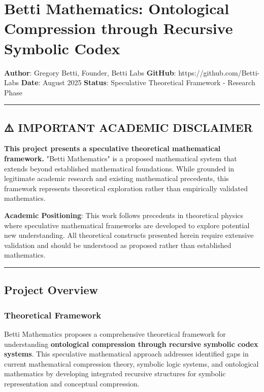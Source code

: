 \chapter{Betti Mathematics: Ontological Compression through Recursive Symbolic Codex}

\textbf{Author}: Gregory Betti, Founder, Betti Labs  
\textbf{GitHub}: https://github.com/Betti-Labs  
\textbf{Date}: August 2025  
\textbf{Status}: Speculative Theoretical Framework - Research Phase

\hrule

\section{⚠️ IMPORTANT ACADEMIC DISCLAIMER}

\textbf{This project presents a speculative theoretical mathematical framework.} "Betti Mathematics" is a proposed mathematical system that extends beyond established mathematical foundations. While grounded in legitimate academic research and existing mathematical precedents, this framework represents theoretical exploration rather than empirically validated mathematics.

\textbf{Academic Positioning}: This work follows precedents in theoretical physics where speculative mathematical frameworks are developed to explore potential new understanding. All theoretical constructs presented herein require extensive validation and should be understood as proposed rather than established mathematics.

\hrule

\section{Project Overview}

\subsection{Theoretical Framework}
Betti Mathematics proposes a comprehensive theoretical framework for understanding \textbf{ontological compression through recursive symbolic codex systems}. This speculative mathematical approach addresses identified gaps in current mathematical compression theory, symbolic logic systems, and ontological mathematics by developing integrated recursive structures for symbolic representation and conceptual compression.


